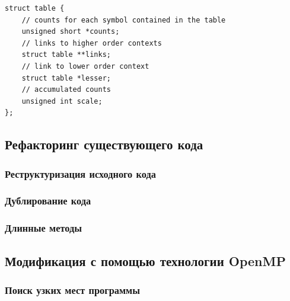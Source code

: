 \documentclass{matmex-diploma-custom}
\begin{document}
\begin{lstlisting}
struct table {
    // counts for each symbol contained in the table
    unsigned short *counts;
    // links to higher order contexts
    struct table **links;
    // link to lower order context
    struct table *lesser;
    // accumulated counts
    unsigned int scale;
};
\end{lstlisting}
\subsection{Рефакторинг существующего кода}
\subsubsection{Реструктуризация исходного кода}
\subsubsection{Дублирование кода}
\subsubsection{Длинные методы}
\subsection{Модификация с помощью технологии OpenMP}
\subsubsection{Поиск узких мест программы}
\end{document}
